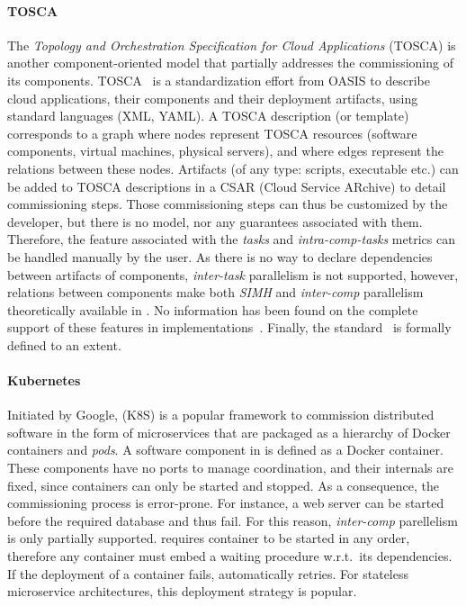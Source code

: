 \paragraph{TOSCA}
The \emph{Topology and Orchestration Specification for Cloud
Applications} (TOSCA) is another component-oriented model that
partially addresses the commissioning of its
components. TOSCA~\cite{tosca:web,brogi2018} is a standardization
effort from OASIS to describe cloud applications, their components and
their deployment artifacts, using standard languages (\ie XML,
YAML). A TOSCA description (or template) corresponds to a graph where
nodes represent TOSCA resources (\eg software components, virtual
machines, physical servers), and where edges represent the relations
between these nodes. Artifacts (of any type: scripts, executable etc.)
can be added to TOSCA descriptions in a CSAR (Cloud Service ARchive)
to detail commissioning steps. Those commissioning steps can thus be
customized by the developer, but there is no model, nor any guarantees
associated with them. Therefore, the feature associated with
the \emph{tasks} and \emph{intra-comp-tasks} metrics can be handled
manually by the user. As there is no way to declare dependencies
between artifacts of components, \emph{inter-task} parallelism is not
supported, however, relations between components make both \emph{SIMH}
and \emph{inter-comp} parallelism theoretically available
in \tosca. No information has been found on the complete support of
these features in \tosca
implementations~\cite{cloudify:web,opentosca:web}. Finally, the \tosca
standard~\cite{7561358} is formally defined to an extent.

\paragraph{Kubernetes}
Initiated by Google, \kubernetes (K8S) is a popular framework to
commission distributed software in the form of microservices that are
packaged as a hierarchy of Docker containers and \emph{pods}. A
software component in \kubernetes is defined as a Docker
container. These components have no ports to manage coordination, and
their internals are fixed, since containers can only be started and
stopped. As a consequence, the commissioning process is
error-prone. For instance, a web server can be started before the
required database and thus fail. For this reason, \emph{inter-comp}
parellelism is only partially supported. \kubernetes requires
container to be started in any order, therefore any container must
embed a waiting procedure w.r.t.\ its dependencies. If the deployment of
a container fails, \kubernetes automatically retries. For stateless
microservice architectures, this deployment strategy is popular.

